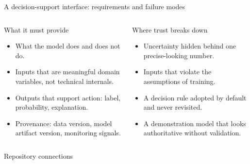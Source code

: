 \begin{frame}{A decision-support interface: requirements and failure modes}
\begin{columns}[T]
\begin{block}{What it must provide}
\footnotesize
\begin{itemize}\setlength{\itemsep}{2pt}
\item What the model does and does not do.
\item Inputs that are meaningful domain variables, not technical internals.
\item Outputs that support action: label, probability, explanation.
\item Provenance: data version, model artifact version, monitoring signals.
\end{itemize}
\end{block}
\begin{alertblock}{Where trust breaks down}
\footnotesize
\begin{itemize}\setlength{\itemsep}{2pt}
\item Uncertainty hidden behind one precise-looking number.
\item Inputs that violate the assumptions of training.
\item A decision rule adopted by default and never revisited.
\item A demonstration model that looks authoritative without validation.
\end{itemize}
\end{alertblock}
\end{columns}
\coursefooter
\end{frame}


\begin{frame}{Repository connections}
\coursefooter
\end{frame}

